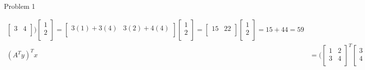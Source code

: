 \begin{problem}{Problem 1}
\begin{Highlight}[Solution]
\begin{align*}
\begin{bmatrix}
                    3 & 4 \\
                \end{bmatrix}
            \Biggr)
            \begin{bmatrix}
                1 \\
                2 \\
            \end{bmatrix}
            = 
            \begin{bmatrix}
                3(1) + 3(4) & 3(2) + 4(4) \\
            \end{bmatrix}
            \begin{bmatrix}
                1 \\
                2 \\
            \end{bmatrix}
            =
            \begin{bmatrix}
                15 & 22 \\
            \end{bmatrix}
            \begin{bmatrix}
                1 \\
                2 \\
            \end{bmatrix}
            = 15 + 44 = 59 \\
            (A^{T}y)^{T}x & = 
            \Biggl(
                \begin{bmatrix}
                    1 & 2 \\
                    3 & 4 \\
                \end{bmatrix}^{T}
                \begin{bmatrix}
                    3 \\
                    4 \\
                \end{bmatrix}
            \Biggr)^{T}
            \begin{bmatrix}
                1 \\
                2 \\
            \end{bmatrix}
            = 
            \Biggl(
                \begin{bmatrix}
                    1 & 3 \\
                    2 & 4 \\
                \end{bmatrix}

\end{align*}
\end{Highlight}
\end{problem}
